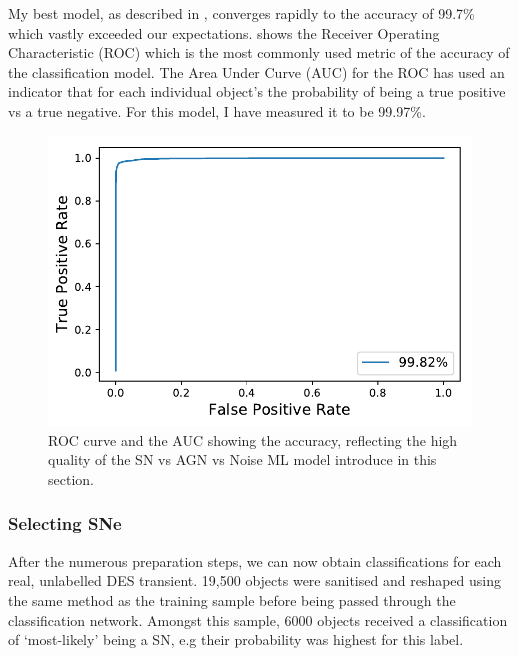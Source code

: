 My best model, as described in , converges rapidly to the accuracy of 99.7\% which vastly exceeded our expectations.  shows the Receiver Operating Characteristic (ROC) which is the most commonly used metric of the accuracy of the classification model. The Area Under Curve (AUC) for the ROC has used an indicator that for each individual object's the probability of being a true positive vs a true negative. For this model, I have measured it to be 99.97\%.

\begin{figure}
  \includegraphics[width=\textwidth]{Figures/Chapter5/SNAGNNoiseROC.pdf}
  \caption{ROC curve and the AUC showing the accuracy, reflecting the high quality of the SN vs AGN vs Noise ML model introduce in this section.}
  \label{fig:AGNNoiseROC}
\end{figure}

\subsubsection{Selecting SNe}
After the numerous preparation steps, we can now obtain classifications for each real, unlabelled DES transient. 19,500 objects were sanitised and reshaped using the same method as the training sample before being passed through the classification network. Amongst this sample, 6000 objects received a classification of `most-likely' being a SN, e.g their probability was highest for this label.

